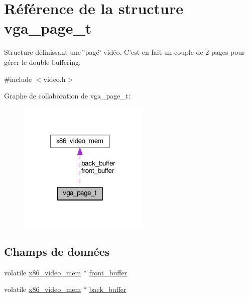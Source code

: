 \hypertarget{structvga__page__t}{\section{Référence de la structure vga\+\_\+page\+\_\+t}
\label{structvga__page__t}
}


Structure définissant une \char`\"{}page\char`\"{} vidéo. C'est en fait un couple de 2 pages pour gérer le double buffering.  




{\ttfamily \#include $<$video.\+h$>$}



Graphe de collaboration de vga\+\_\+page\+\_\+t\+:
\nopagebreak
\begin{figure}[H]
\begin{center}
\leavevmode
\includegraphics[width=177pt]{structvga__page__t__coll__graph}
\end{center}
\end{figure}
\subsection*{Champs de données}
\begin{DoxyCompactItemize}
\item 
volatile \hyperlink{structx86__video__mem}{x86\+\_\+video\+\_\+mem} $\ast$ \hyperlink{structvga__page__t_a8f820f9799bc5f9886e9f74c09e24841}{front\+\_\+buffer}
\item 
volatile \hyperlink{structx86__video__mem}{x86\+\_\+video\+\_\+mem} $\ast$ \hyperlink{structvga__page__t_aaad0350a467498fb34a0b8b1586ac76c}{back\+\_\+buffer}
\end{DoxyCompactItemize}


